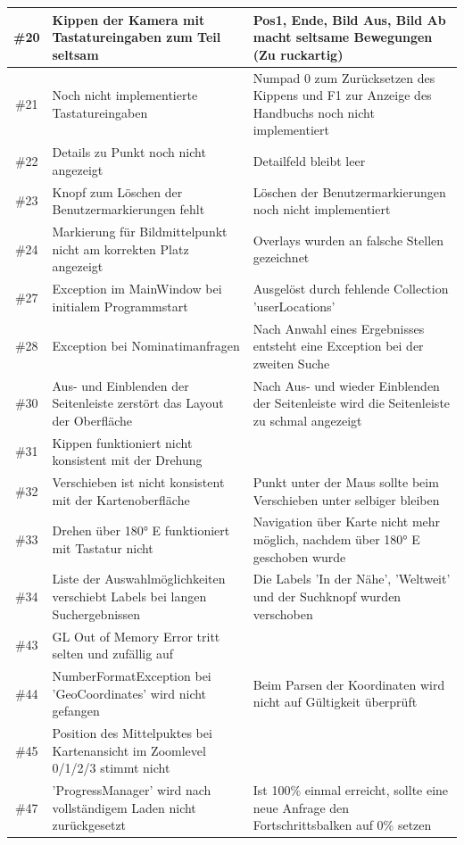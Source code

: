 \documentclass[10pt]{scrreprt}
\begin{document}
\begin{longtable}{|c|p{5.2cm}|p{8.2cm}|}
\hline
\#20 & Kippen der Kamera mit Tastatureingaben zum Teil seltsam & Pos1, Ende, Bild Aus, Bild Ab macht seltsame Bewegungen (Zu ruckartig) \\
\hline
\#21 & Noch nicht implementierte Tastatureingaben & Numpad 0 zum Zurücksetzen des Kippens und F1 zur Anzeige des Handbuchs noch nicht implementiert \\
\hline
\#22 & Details zu Punkt noch nicht angezeigt & Detailfeld bleibt leer \\
\hline
\#23 & Knopf zum Löschen der Benutzermarkierungen fehlt & Löschen der Benutzermarkierungen noch nicht implementiert \\
\hline
\#24 & Markierung für Bildmittelpunkt nicht am korrekten Platz angezeigt & Overlays wurden an falsche Stellen gezeichnet \\
\hline
\#27 & Exception im MainWindow bei initialem Programmstart & Ausgelöst durch fehlende Collection 'userLocations' \\
\hline
\#28 & Exception bei Nominatimanfragen & Nach Anwahl eines Ergebnisses entsteht eine Exception bei der zweiten Suche \\
\hline
\#30 & Aus- und Einblenden der Seitenleiste zerstört das Layout der Oberfläche & Nach Aus- und wieder Einblenden der Seitenleiste wird die Seitenleiste zu schmal angezeigt \\
\hline
\#31 & Kippen funktioniert nicht konsistent mit der Drehung & \\
\hline
\#32 & Verschieben ist nicht konsistent mit der Kartenoberfläche & Punkt unter der Maus sollte beim Verschieben unter selbiger bleiben \\
\hline
\#33 & Drehen über 180° E funktioniert mit Tastatur nicht & Navigation über Karte nicht mehr möglich, nachdem über 180° E geschoben wurde \\
\hline
\#34 & Liste der Auswahlmöglichkeiten verschiebt Labels bei langen Suchergebnissen & Die Labels 'In der Nähe', 'Weltweit' und der Suchknopf wurden verschoben \\
\hline
\#43 & GL Out of Memory Error tritt selten und zufällig auf & \\
\hline
\#44 & NumberFormatException bei 'GeoCoordinates' wird nicht gefangen & Beim Parsen der Koordinaten wird nicht auf Gültigkeit überprüft \\
\hline
\#45 & Position des Mittelpuktes bei Kartenansicht im Zoomlevel 0/1/2/3 stimmt nicht & \\
\hline
\#47 & 'ProgressManager' wird nach vollständigem Laden nicht zurückgesetzt & Ist 100\% einmal erreicht, sollte eine neue Anfrage den Fortschrittsbalken auf 0\% setzen \\

\end{longtable}
\end{document}

